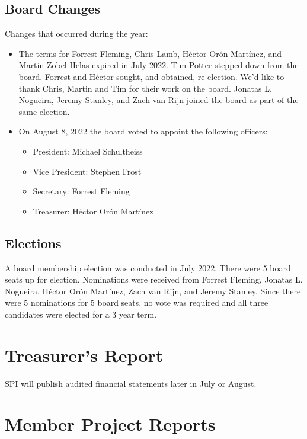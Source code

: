 \documentclass[a4paper]{report}
\begin{document}
\section{Board Changes}

Changes that occurred during the year:

\begin{itemize}

\item The terms for Forrest Fleming, Chris Lamb, Héctor Orón Martínez, and Martin Zobel-Helas expired in July 2022.  Tim Potter stepped down from the board.  Forrest and Héctor sought, and obtained, re-election.  We'd like to thank Chris, Martin and Tim for their work on the board.  Jonatas L. Nogueira, Jeremy Stanley, and Zach van Rijn joined the board as part of the same election.

\item On August 8, 2022 the board voted to appoint the following officers:

\begin{itemize}
\item President: Michael Schultheiss
\item Vice President: Stephen Frost
\item Secretary: Forrest Fleming
\item Treasurer: Héctor Orón Martínez
\end{itemize}

\end{itemize}

\section{Elections}

A board membership election was conducted in July 2022.  There were 5 board seats up for election.  Nominations were received from Forrest Fleming, Jonatas L. Nogueira, Héctor Orón Martínez, Zach van Rijn, and Jeremy Stanley.  Since there were 5 nominations for 5 board seats, no vote was required and all three candidates were elected for a 3 year term.

\chapter{Treasurer's Report}

SPI will publish audited financial statements later in July or August.

\chapter{Member Project Reports}
\end{document}
